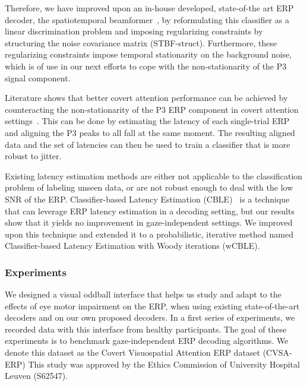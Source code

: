 Therefore, we have improved upon an in-house developed, state-of-the art ERP
decoder, the spatiotemporal beamformer~\cite{Wittevrongel2016}, by reformulating
this classifier as a linear discrimination problem and
imposing regularizing constraints by structuring the noise covariance matrix
(STBF-struct).
Furthermore, these regularizing constraints impose temporal stationarity on
the background noise, which is of use in our next efforts to cope with the
non-stationarity of the P3 signal component.

Literature shows that better covert attention performance can be achieved by
counteracting the non-stationarity of the P3 ERP component in covert
attention settings~\cite{Arico2014}.
This can be done by estimating the latency of each single-trial ERP and aligning
the P3 peaks to all fall at the same moment.
The resulting aligned data and the set of latencies can then be used to train a
classifier that is more robust to jitter.

Existing latency estimation methods are either not applicable to the
classification problem of labeling unseen data, or are not robust enough to
deal with the low SNR of the ERP.
Classifier-based Latency Estimation (CBLE)~\cite{Mowla2017} is a technique that can leverage
ERP latency estimation in a decoding setting, but our results show that it
yields no improvement in gaze-independent settings.
We improved upon this technique and extended it to a probabilistic, iterative
method named Classifier-based Latency Estimation with Woody iterations (wCBLE).


\subsubsection{Experiments}
We designed a visual oddball interface that helps us study and adapt
to the effects of eye motor impairment on the ERP, when using existing state-of-the-art
decoders and on our own proposed decoders.
In a first series of experiments, we recorded data with this interface from healthy participants.
The goal of these experiments is to benchmark
gaze-independent ERP decoding algorithms.
We denote this dataset as the Covert Visuospatial Attention ERP dataset
(CVSA-ERP)
This study was approved by the Ethics Commission of University Hospital Leuven
(S62547).

